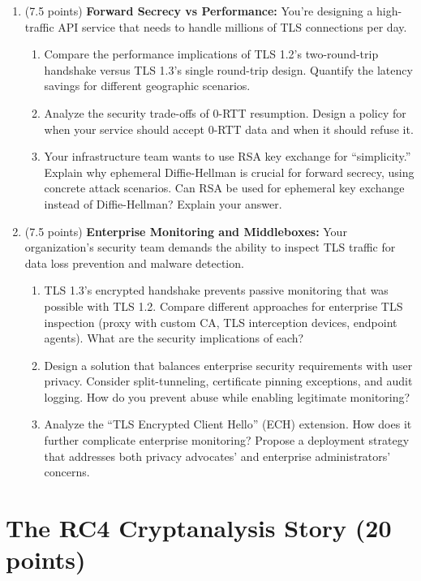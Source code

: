 \documentclass[10pt,a4paper,american]{exam}
\begin{document}
\begin{enumerate}
	\item (7.5 points) \textbf{Forward Secrecy vs Performance:}
	      You're designing a high-traffic API service that needs to handle millions of TLS connections per day.
	      \begin{enumerate}
		      \item Compare the performance implications of TLS 1.2's two-round-trip handshake versus TLS 1.3's single round-trip design. Quantify the latency savings for different geographic scenarios.
		      \item Analyze the security trade-offs of 0-RTT resumption. Design a policy for when your service should accept 0-RTT data and when it should refuse it.
		      \item Your infrastructure team wants to use RSA key exchange for ``simplicity.'' Explain why ephemeral Diffie-Hellman is crucial for forward secrecy, using concrete attack scenarios. Can RSA be used for ephemeral key exchange instead of Diffie-Hellman? Explain your answer.
	      \end{enumerate}
	\item (7.5 points) \textbf{Enterprise Monitoring and Middleboxes:}
	      Your organization's security team demands the ability to inspect TLS traffic for data loss prevention and malware detection.
	      \begin{enumerate}
		      \item TLS 1.3's encrypted handshake prevents passive monitoring that was possible with TLS 1.2. Compare different approaches for enterprise TLS inspection (proxy with custom CA, TLS interception devices, endpoint agents). What are the security implications of each?
		      \item Design a solution that balances enterprise security requirements with user privacy. Consider split-tunneling, certificate pinning exceptions, and audit logging. How do you prevent abuse while enabling legitimate monitoring?
		      \item Analyze the ``TLS Encrypted Client Hello'' (ECH) extension. How does it further complicate enterprise monitoring? Propose a deployment strategy that addresses both privacy advocates' and enterprise administrators' concerns.
	      \end{enumerate}
\end{enumerate}

\section{The RC4 Cryptanalysis Story (20 points)}
\end{document}
